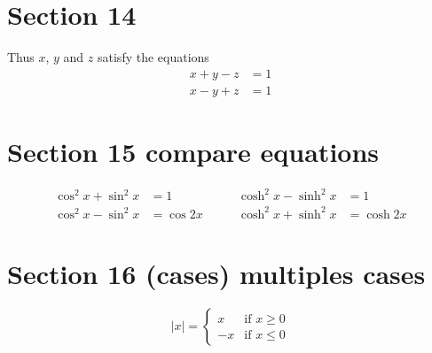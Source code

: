 \documentclass{article}
\begin{document}
\section{ Section   14}
Thus $x$, $y$ and $z$ satisfy the equations
\begin{align*}
x+y-z & = 1\\
x-y+z & = 1
\end{align*}

\section{ Section   15 compare equations}
\begin{align*}
\cos^2x+\sin^2x & = 1
&\qquad \cosh^2x-\sinh^2x & = 1\\
\cos^2x-\sin^2x & = \cos 2x &\qquad \cosh^2x+\sinh^2x & = \cosh 2x
\end{align*}

\section{ Section   16 (cases) multiples cases}
\begin{equation*}
|x| =
\begin{cases}
x & \text{if $x\ge 0$}\\
-x & \text{if $x\le 0$}
\end{cases}
\end{equation*}
\end{document}
